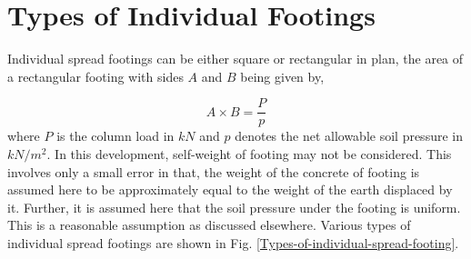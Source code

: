 \documentclass{report}
\newcommand{\figmacro}[1] {Fig. #1}
\begin{document}
\section{Types of Individual Footings} Individual spread footings can be either square or rectangular in plan, the area of a rectangular footing with sides $A$ and $B$ being given by,

\begin{equation}
\label{eq:footingArea}
A \times B = \frac{P}{p}
\end{equation}
where $P$ is the column load in $kN$ and $p$ denotes the net allowable soil
pressure in $kN/m^2$. In this development, self-weight of footing may not
be considered. This involves only a small error in that, the weight of the
concrete of footing is assumed here to be approximately equal to the weight
of the earth displaced by it. Further, it is assumed here that the soil
pressure under the footing is uniform. This is a reasonable assumption as
discussed elsewhere. Various types of  individual spread footings are shown in \figmacro \ref{Types-of-individual-spread-footing}.
\end{document}
